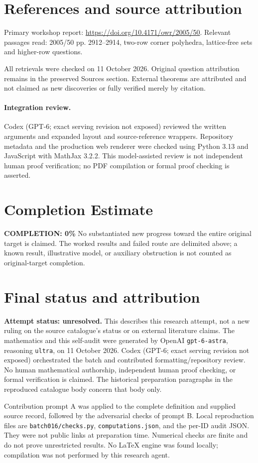 \documentclass[11pt]{article}
\begin{document}
\section{References and source attribution}
Primary workshop report: \url{https://doi.org/10.4171/owr/2005/50}. Relevant passages read: 2005/50 pp. 2912--2914, two-row corner polyhedra, lattice-free sets and higher-row questions.

All retrievals were checked on 11 October 2026. Original question attribution remains in the preserved Sources section. External theorems are attributed and not claimed as new discoveries or fully verified merely by citation.


\paragraph{Integration review.} Codex (GPT-6; exact serving revision not exposed) reviewed the written arguments and expanded layout and source-reference wrappers. Repository metadata and the production web renderer were checked using Python 3.13 and JavaScript with MathJax 3.2.2. This model-assisted review is not independent human proof verification; no PDF compilation or formal proof checking is asserted.

\section{Completion Estimate}
\noindent\textbf{COMPLETION: 0\%}
No substantiated new progress toward the entire original target is claimed. The worked results and failed route are delimited above; a known result, illustrative model, or auxiliary obstruction is not counted as original-target completion.

\section{Final status and attribution}
\textbf{Attempt status: unresolved.} This describes this research attempt, not a new ruling on the source catalogue's status or on external literature claims.
The mathematics and this self-audit were generated by OpenAI \texttt{gpt-6-astra}, reasoning \texttt{ultra}, on 11 October 2026. Codex (GPT-6; exact serving revision not exposed) orchestrated the batch and contributed formatting/repository review. No human mathematical authorship, independent human proof checking, or formal verification is claimed. The historical preparation paragraphs in the reproduced catalogue body concern that body only.

Contribution prompt A was applied to the complete definition and supplied source record, followed by the adversarial checks of prompt B. Local reproduction files are \texttt{batch016/checks.py}, \texttt{computations.json}, and the per-ID audit JSON. They were not public links at preparation time. Numerical checks are finite and do not prove unrestricted results. No LaTeX engine was found locally; compilation was not performed by this research agent.
\end{document}
